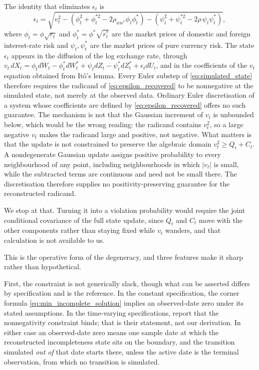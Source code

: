 \documentclass[11pt]{article}
\theoremstyle{definition}
\begin{document}
The identity that eliminates $\epsilon_t$ is
\begin{equation}\label{eq:epsilon_recovered}
\epsilon_t
=\sqrt{
v_t^2
-(\phi_t^2+\phi_t^{*2}-2\rho_{ww^*}\phi_t\phi_t^*)
-(\psi_t^2+\psi_t^{*2}-2\rho\,\psi_t\psi_t^*)
},
\end{equation}
where $\phi_t=\phi\sqrt{r_t}$ and $\phi_t^*=\phi^*\sqrt{r_t^*}$ are the market prices of domestic and foreign interest-rate risk and $\psi_t,\psi_t^*$ are the market prices of pure currency risk. The state $\epsilon_t$ appears in the diffusion of the log exchange rate, through $v_t\,dX_t=\phi_t dW_t-\phi_t^*dW_t^*+\psi_t dZ_t-\psi_t^*dZ_t^*+\epsilon_t dU_t$, and in the coefficients of the $v_t$ equation obtained from It\^o's lemma. Every Euler substep of \eqref{eq:simulated_state} therefore requires the radicand of \eqref{eq:epsilon_recovered} to be nonnegative at the simulated state, not merely at the observed data. Ordinary Euler discretisation of a system whose coefficients are defined by \eqref{eq:epsilon_recovered} offers no such guarantee. The mechanism is not that the Gaussian increment of $v_t$ is unbounded below, which would be the wrong reading: the radicand contains $v_t^2$, so a large negative $v_t$ makes the radicand large and positive, not negative. What matters is that the update is not constrained to preserve the algebraic domain $v_t^2\ge Q_t+C_t$. A nondegenerate Gaussian update assigns positive probability to every neighbourhood of any point, including neighbourhoods in which $|v_t|$ is small, while the subtracted terms are continuous and need not be small there. The discretisation therefore supplies no positivity-preserving guarantee for the reconstructed radicand.

We stop at that. Turning it into a violation probability would require the joint conditional covariance of the full state update, since $Q_t$ and $C_t$ move with the other components rather than staying fixed while $v_t$ wanders, and that calculation is not available to us.

This is the operative form of the degeneracy, and three features make it sharp rather than hypothetical.

First, the constraint is not generically slack, though what can be asserted differs by specification and  is the reference. In the constant specification, the corner formula \eqref{eq:min_incomplete_solution} implies an observed-date zero under its stated assumptions. In the time-varying specifications, \citet{BrandtSantaClara2002} report that the nonnegativity constraint binds; that is their statement, not our derivation. In either case an observed-date zero means one sample date at which the reconstructed incompleteness state sits on the boundary, and the transition simulated \emph{out of} that date starts there, unless the active date is the terminal observation, from which no transition is simulated.
\end{document}

